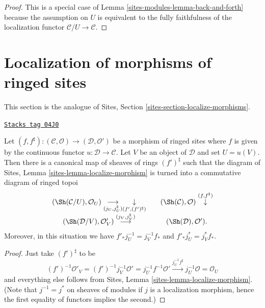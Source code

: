 \begin{proof}
This is a special case of Lemma \ref{sites-modules-lemma-back-and-forth}
because the assumption on $U$ is equivalent to the fully faithfulness
of the localization functor $\mathcal{C}/U \to \mathcal{C}$.
\end{proof}

\section{Localization of morphisms of ringed sites}
\label{sites-modules-section-localize-morphisms}
This section is the analogue of
Sites, Section \ref{sites-section-localize-morphisms}.

\begin{lemma}
\label{sites-modules-lemma-localize-morphism-ringed-sites}
\href{https://stacks.math.columbia.edu/tag/04J0}{\texttt{Stacks tag 04J0}}

Let
$(f, f^\sharp) :
(\mathcal{C}, \mathcal{O})
\longrightarrow
(\mathcal{D}, \mathcal{O}')$
be a morphism of ringed sites where $f$ is given by the continuous
functor $u : \mathcal{D} \to \mathcal{C}$.
Let $V$ be an object of $\mathcal{D}$ and set $U = u(V)$.
Then there is a canonical map of sheaves of rings $(f')^\sharp$
such that the diagram of
Sites, Lemma \ref{sites-lemma-localize-morphism}
is turned into a commutative diagram of ringed topoi
$$
\begin{array}{ccc}(\Sh(\mathcal{C}/U), \mathcal{O}_U)
\underset{(j_U, j_U^\sharp)}{\longrightarrow}\underset{(f', (f')^\sharp)}{\downarrow} &  & (\Sh(\mathcal{C}), \mathcal{O})
\overset{(f, f^\sharp)}{\downarrow} \\ (\Sh(\mathcal{D}/V), \mathcal{O}'_V)
\overset{(j_V, j_V^\sharp)}{\longrightarrow} &  & (\Sh(\mathcal{D}), \mathcal{O}').\end{array}
$$
Moreover, in this situation we have $f'_*j_U^{-1} = j_V^{-1}f_*$
and $f'_*j_U^* = j_V^*f_*$.
\end{lemma}

\begin{proof}
Just take $(f')^\sharp$ to be
$$
(f')^{-1}\mathcal{O}'_V =
(f')^{-1}j_V^{-1}\mathcal{O}' =
j_U^{-1}f^{-1}\mathcal{O}' \xrightarrow{j_U^{-1}f^\sharp}
j_U^{-1}\mathcal{O} = \mathcal{O}_U
$$
and everything else follows from
Sites, Lemma \ref{sites-lemma-localize-morphism}.
(Note that $j^{-1} = j^*$ on sheaves of modules if $j$ is a localization
morphism, hence the first equality of functors implies the second.)
\end{proof}

